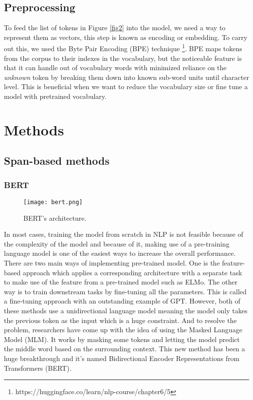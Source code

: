 \documentclass[conference]{IEEEtran}
\begin{document}
\subsection{Preprocessing}
To feed the list of tokens in Figure \ref{fig2} into the model, we need a way to represent them
as vectors, this step is known as encoding or embedding. To carry out this, we used the 
Byte Pair Encoding (BPE) technique \footnote{https://huggingface.co/learn/nlp-course/chapter6/5}. BPE maps tokens from the corpus
to their indexes in the vocabulary, but the noticeable feature is that it can handle 
out of vocabulary words with minimized reliance on the \emph{unknown} token by breaking 
them down into known sub-word units until character level. This is beneficial when we want to 
reduce the vocabulary size or fine tune a model with pretrained vocabulary.

\section{Methods} \label{section4}

\subsection{Span-based methods}
\subsubsection{BERT\cite{devlin2019bert}}

\begin{figure}
    \centering
    \texttt{[image: bert.png]}
    \caption{BERT's architecture.}
    \label{fig:enter-label}
\end{figure}

\noindent In most cases, training the model from scratch in NLP is not feasible because of the
complexity of the model and because of it, making use of a pre-training language model is one
of the easiest ways to increase the overall performance. There are two main ways of implementing
pre-trained model. One is the feature-based approach which applies a corresponding 
architecture with a separate task to make use of the feature from a pre-trained model such as ELMo. 
The other way is to train downstream tasks by fine-tuning all the parameters. This is called a
fine-tuning approach with an outstanding example of GPT. However, both of these methods 
use a unidirectional language model meaning the model only takes the previous token as the 
input which is a huge constraint. And to resolve the problem, researchers have come up with 
the idea of using the Masked Language Model (MLM). It works by masking some tokens and letting 
the model predict the middle word based on the surrounding context. This new method has been 
a huge breakthrough and it’s named Bidirectional Encoder Representations from Transformers (BERT).\\
\end{document}
